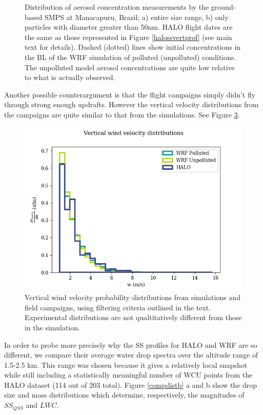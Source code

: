 \documentclass{article}
\begin{document}
\begin{figure}[ht]
\begin{subfigure}{0.7\textwidth}
		\label{goamazonuap50hist}
		\caption{}
	\end{subfigure}
	\caption{Distribution of aerosol concentration measurements by the ground-based SMPS at Manacapuru, Brazil; a) entire size range, b) only particles with diameter greater than 50nm. HALO flight dates are the same as those represented in Figure \ref{halossvertprof} (see main text for details). Dashed (dotted) lines show initial concentrations in the BL of the WRF simulation of polluted (unpolluted) conditions. The unpolluted model aerosol concentrations are quite low relative to what is actually observed.}
	\label{goamazonhist}
\end{figure}

Another possible counterargument is that the flight campaigns simply didn't fly through strong enough updrafts. However the vertical velocity distributions from the campaigns are quite similar to that from the simulations. See Figure \ref{combinedwhist}. 

\begin{figure}[ht]
    \centering
    \includegraphics[width=12cm]{wrf/combined_w_hist_figure.png}
    \caption{Vertical wind velocity probability distributions from simulations and field campaigns, using filtering criteria outlined in the text. Experimental distributions are not qualtitatively different from those in the simulation.}
    \label{combinedwhist}
\end{figure}

In order to probe more precisely why the SS profiles for HALO and WRF are so different, we compare their average water drop spectra over the altitude range of 1.5-2.5 km. This range was chosen because it gives a relatively local snapshot while still including a statistically meaningful number of WCU points from the HALO dataset (114 out of 203 total). Figure \ref{compdistb} a and b show the drop size and mass distributions which determine, respectively, the magnitudes of $SS_{QSS}$ and $LWC$. 
\end{document}
